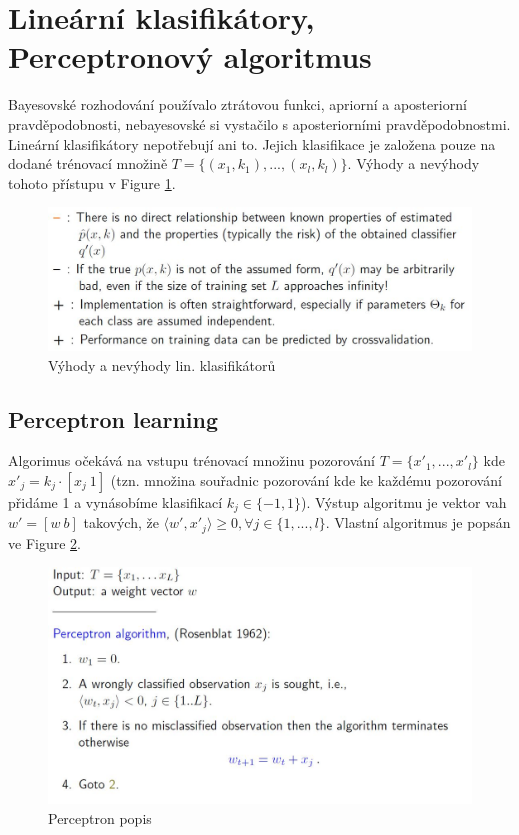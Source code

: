 \documentclass{article}
\begin{document}
\section{Lineární klasifikátory, Perceptronový algoritmus}
Bayesovské rozhodování používalo ztrátovou funkci, apriorní a aposteriorní pravděpodobnosti, nebayesovské si vystačilo s aposteriorními pravděpodobnostmi. Lineární klasifikátory nepotřebují ani to. Jejich klasifikace je založena pouze na dodané trénovací množině $T = \{(x_1, k_1), ..., (x_l, k_l)\}$. Výhody a nevýhody tohoto přístupu v Figure \ref{fig:pros_cons}.

\begin{figure}[h]
\begin{center}
\includegraphics[width=12cm]{pros_cons.jpg}
\caption{Výhody a nevýhody lin. klasifikátorů}
\label{fig:pros_cons}
\end{center}
\end{figure} 

\subsection{Perceptron learning}

Algorimus očekává na vstupu trénovací množinu pozorování $T = \{x'_1, ..., x'_l\}$ kde $x'_j = k_j \cdot [x_j\ 1]$ (tzn. množina souřadnic pozorování kde ke každému pozorování přidáme 1 a vynásobíme klasifikací $k_j \in \{-1, 1\}$). Výstup algoritmu je vektor vah $w' = [w\ b]$ takových, že $\langle w', x'_j \rangle \geq 0, \forall j \in \{1,...,l\}$. Vlastní algoritmus je popsán ve Figure \ref{fig:perceptron}. 

\begin{figure}[h]
\begin{center}
\includegraphics[width=12cm]{perceptron.jpg}
\caption{Perceptron popis}
\label{fig:perceptron}
\end{center}
\end{figure} 
\end{document}
